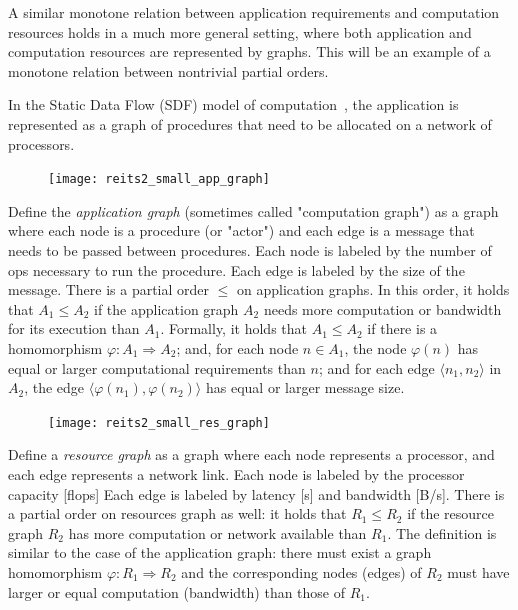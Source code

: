 A similar monotone relation between application requirements and computation
resources holds in a much more general setting, where both application
and computation resources are represented by graphs. This will be
an example of a monotone relation between nontrivial partial orders.

In the Static Data Flow (SDF) model of computation~\cite[Chapter 3]{sriram00,lee10},
the application is represented as a graph of procedures that need
to be allocated on a network of processors.

\begin{figure}
\texttt{[image: reits2\_small\_app\_graph]}
\end{figure}

Define the\emph{ application graph }(sometimes called "computation
graph") as a graph where each node is a procedure (or "actor")
and each edge is a message that needs to be passed between procedures.
Each node is labeled by the number of ops necessary to run the procedure.
Each edge is labeled by the size of the message. There is a partial
order $ \leq$ on application graphs. In this order, it holds that $A_1 \leq A_2$
if the application graph $A_2$ needs more computation or bandwidth
for its execution than $A_1$. Formally, it holds that $A_1 \leq A_2$
if there is a homomorphism $\varphi:A_1  \Rightarrow A_2$; and,
for each node $n \in A_1$, the node $\varphi(n)$ has equal or
larger computational requirements than $n$; and for each edge $⟨n_1,n_2⟩ $
in $A_2$, the edge $⟨\varphi(n_1),\varphi(n_2)⟩ $
has equal or larger message size.

\begin{figure}
\texttt{[image: reits2\_small\_res\_graph]}\end{figure}

Define a\emph{ resource graph} as a graph where each node represents
a processor, and each edge represents a network link. Each node is
labeled by the processor capacity [flops] Each edge is labeled
by latency [s] and bandwidth [B/s]. There is a partial order
on resources graph as well: it holds that $R_1 \leq R_2$ if
the resource graph $R_2$ has more computation or network available
than $R_1$. The definition is similar to the case of the application
graph: there must exist a graph homomorphism $\varphi:R_1  \Rightarrow R_2$
and the corresponding nodes (edges) of $R_2$ must have larger
or equal computation (bandwidth) than those of $R_1$.

